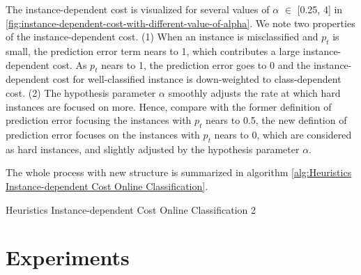 \documentclass{article}
\begin{document}
The instance-dependent cost is visualized for several values of $\alpha$ $\in$
[0.25, 4] in \ref{fig:instance-dependent-cost-with-different-value-of-alpha}. We note two properties of the instance-dependent cost.
(1) When an instance is misclassified and $p_t$ is small, the
prediction error term nears to 1, which contributes a large instance-dependent cost. As
$p_t$ nears to 1, the prediction error goes to 0 and the instance-dependent cost for well-classified instance is down-weighted to class-dependent cost. (2) The hypothesis parameter $\alpha$ smoothly adjusts the rate at which hard instances are focused on more. Hence, compare with the former definition of prediction error focusing the instances with $p_t$ nears to 0.5, the new defintion of prediction error focuses on the instances with $p_t$ nears to 0, which are considered as hard instances, and slightly adjusted by the hypothesis parameter $\alpha$.

The whole process with new structure is summarized in algorithm \ref{alg:Heuristics Instance-dependent Cost Online Classification}.

\begin{algorithm}
	\caption{Heuristics Instance-dependent Cost Online Classification 2}
\label{alg:Heuristics Instance-dependent Cost Online Classification}
\end{algorithm}



\section{Experiments}
\end{document}
